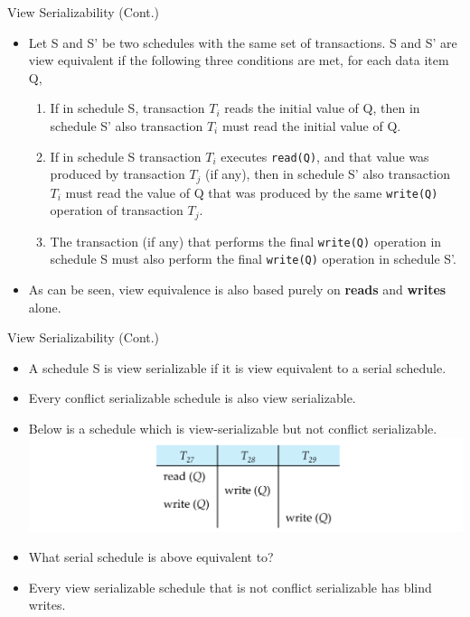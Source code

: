 \documentclass{beamer}
\begin{document}
\begin{frame}{View Serializability (Cont.)}

    \begin{itemize}
        \item Let S and S' be two schedules with the same set of transactions. S and S' are view equivalent if the following three conditions are met, for each data item Q,
            \begin{enumerate}
                \item If in schedule S, transaction $T_i$ reads the initial value of Q, then in schedule S' also transaction $T_i$ must read the initial value of Q.
                \item If in schedule S transaction $T_i$ executes \texttt{read(Q)}, and that value was produced by transaction $T_j$ (if any), then in schedule S' also transaction $T_i$ must read the value of Q that was produced by the same \texttt{write(Q)} operation of transaction $T_j$.
                \item The transaction (if any) that performs the final \texttt{write(Q)} operation in schedule S must also perform the final \texttt{write(Q)} operation in schedule S'.
            \end{enumerate}
        \item As can be seen, view equivalence is also based purely on \textbf{reads} and \textbf{writes} alone.
    \end{itemize}

\end{frame}

\begin{frame}{View Serializability (Cont.)}
    \begin{itemize}
        \item A schedule S is view serializable if it is view equivalent to a serial schedule.
        \item Every conflict serializable schedule is also view serializable.
        \item Below is a schedule which is view-serializable but not conflict serializable.
            \includegraphics[width=.9\textwidth]{figures/view_ser1}
        \item What serial schedule is above equivalent to?
        \item Every view serializable schedule that is not conflict serializable has blind writes.
    \end{itemize}
\end{frame}
\end{document}
